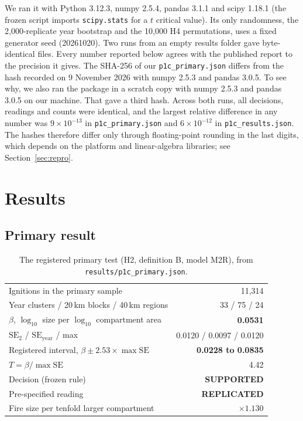 \documentclass[11pt]{article}
\begin{document}
We ran it with Python 3.12.3, numpy 2.5.4, pandas 3.1.1 and scipy 1.18.1 (the frozen script imports \texttt{scipy.stats} for a
$t$ critical value). Its only randomness, the 2{,}000-replicate year bootstrap and the 10{,}000 H4 permutations, uses a fixed generator
seed (20261020). Two runs from an empty results folder gave byte-identical files. Every number reported below agrees with the
published report to the precision it gives. The SHA-256 of our \texttt{p1c\_primary.json} differs from the hash recorded on 9 November 2026
with numpy 2.5.3 and pandas 3.0.5. To see why, we also ran the package in a scratch copy with numpy 2.5.3 and pandas 3.0.5 on our machine.
That gave a third hash. Across both runs, all decisions, readings and counts were identical, and the largest relative difference in any number
was $9\times10^{-13}$ in \texttt{p1c\_primary.json} and $6\times10^{-12}$ in \texttt{p1c\_results.json}. The hashes therefore differ only through floating-point
rounding in the last digits, which depends on the platform and linear-algebra libraries; see Section~\ref{sec:repro}.

\section{Results}

\subsection{Primary result}
\begin{table}[h]\centering
\caption{The registered primary test (H2, definition B, model M2R), from \texttt{results/p1c\_primary.json}.}
\begin{tabular}{lr}\toprule
Ignitions in the primary sample & 11{,}314 \\
Year clusters / 20\,km blocks / 40\,km regions & 33 / 75 / 24 \\
$\beta$, $\log_{10}$ size per $\log_{10}$ compartment area & \textbf{0.0531} \\
$\mathrm{SE}_2$ / $\mathrm{SE}_{\text{year}}$ / max & 0.0120 / 0.0097 / 0.0120 \\
Registered interval, $\beta\pm2.53\times\max\mathrm{SE}$ & \textbf{0.0228 to 0.0835} \\
$T=\beta/\max\mathrm{SE}$ & 4.42 \\
Decision (frozen rule) & \textbf{SUPPORTED} \\
Pre-specified reading & \textbf{REPLICATED} \\
Fire size per tenfold larger compartment & $\times1.130$ \\
\bottomrule\end{tabular}\end{table}
\end{document}
